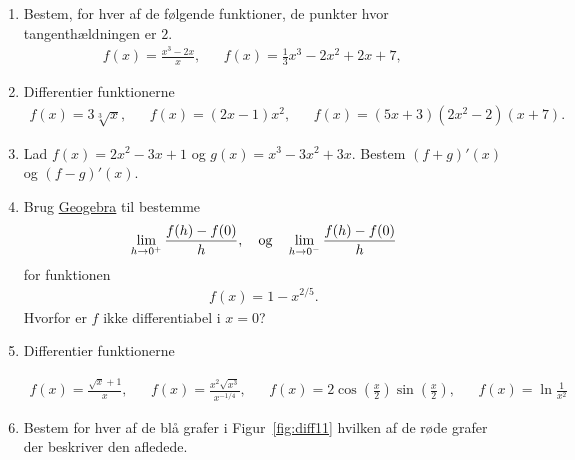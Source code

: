 \begin{enumerate}
	\item Bestem, for hver af de følgende funktioner, de punkter hvor tangenthældningen er $2$.
	\begin{align*}
	f(x)=\frac{x^3-2x}{x},&& f(x)=\frac{1}{3}x^3-2x^2+2x+7,&& 
	\end{align*}
	
	\item Differentier funktionerne 
	\begin{align*}
	f(x)=3\sqrt[3]{x},&& f(x)=(2x-1)x^2,&& f(x)=(5x+3)(2x^2-2)(x+7).
	\end{align*}
	
	\item Lad $f(x)=2x^2-3x+1$ og $g(x)=x^3-3x^2+3x$. Bestem $(f+g)'(x)$ og $(f-g)'(x)$.
	
	\item Brug \href{https://www.geogebra.org/m/eTmzBFEq}{Geogebra} til bestemme 
	\begin{align*}
	\lim_{h\to 0^+} \frac{f(h)-f(0)}{h},\quad \textup{og}\quad \lim_{h\to 0^-} \frac{f(h)-f(0)}{h}
	\end{align*}
	 for funktionen
	\begin{align*}
	f(x)=1-x^{2/5}.
	\end{align*}
	Hvorfor er $f$ ikke differentiabel i $x=0$?
	
	\item Differentier funktionerne
	
	\begin{align*}
		f(x)=\frac{\sqrt{x}+1}{x},&& f(x)=\frac{x^2\sqrt{x^3}}{x^{-1/4}},&& f(x)=2\cos(\frac{x}{2})\sin(\frac{x}{2}),&&f(x)=\ln\frac{1}{x^2}
	\end{align*}
	
	

	
	\item \label{it:diff11} Bestem for hver af de blå grafer i Figur~\ref{fig:diff11} hvilken af de røde grafer der beskriver den afledede.
		\begin{figure}
		\centering
		

\end{figure}
\end{enumerate}
